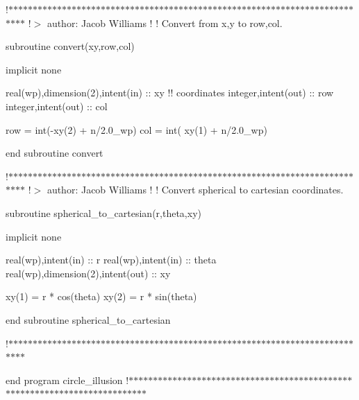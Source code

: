  !$\ast$$\ast$$\ast$$\ast$$\ast$$\ast$$\ast$$\ast$$\ast$$\ast$$\ast$$\ast$$\ast$$\ast$$\ast$$\ast$$\ast$$\ast$$\ast$$\ast$$\ast$$\ast$$\ast$$\ast$$\ast$$\ast$$\ast$$\ast$$\ast$$\ast$$\ast$$\ast$$\ast$$\ast$$\ast$$\ast$$\ast$$\ast$$\ast$$\ast$$\ast$$\ast$$\ast$$\ast$$\ast$$\ast$$\ast$$\ast$$\ast$$\ast$$\ast$$\ast$$\ast$$\ast$$\ast$$\ast$$\ast$$\ast$$\ast$$\ast$$\ast$$\ast$$\ast$$\ast$$\ast$$\ast$$\ast$$\ast$$\ast$$\ast$$\ast$$\ast$$\ast$$\ast$$\ast$ !$>$ author\+: Jacob Williams ! ! Convert from x,y to row,col. \begin{DoxyVerb}subroutine convert(xy,row,col)

implicit none

real(wp),dimension(2),intent(in) :: xy  !! coordinates
integer,intent(out) :: row
integer,intent(out) :: col

row = int(-xy(2) + n/2.0_wp)
col = int( xy(1) + n/2.0_wp)

end subroutine convert
\end{DoxyVerb}
 !$\ast$$\ast$$\ast$$\ast$$\ast$$\ast$$\ast$$\ast$$\ast$$\ast$$\ast$$\ast$$\ast$$\ast$$\ast$$\ast$$\ast$$\ast$$\ast$$\ast$$\ast$$\ast$$\ast$$\ast$$\ast$$\ast$$\ast$$\ast$$\ast$$\ast$$\ast$$\ast$$\ast$$\ast$$\ast$$\ast$$\ast$$\ast$$\ast$$\ast$$\ast$$\ast$$\ast$$\ast$$\ast$$\ast$$\ast$$\ast$$\ast$$\ast$$\ast$$\ast$$\ast$$\ast$$\ast$$\ast$$\ast$$\ast$$\ast$$\ast$$\ast$$\ast$$\ast$$\ast$$\ast$$\ast$$\ast$$\ast$$\ast$$\ast$$\ast$$\ast$$\ast$$\ast$$\ast$ !$>$ author\+: Jacob Williams ! ! Convert spherical to cartesian coordinates. \begin{DoxyVerb}subroutine spherical_to_cartesian(r,theta,xy)

implicit none

real(wp),intent(in) :: r
real(wp),intent(in) :: theta
real(wp),dimension(2),intent(out) :: xy

xy(1) = r * cos(theta)
xy(2) = r * sin(theta)

end subroutine spherical_to_cartesian
\end{DoxyVerb}
 !$\ast$$\ast$$\ast$$\ast$$\ast$$\ast$$\ast$$\ast$$\ast$$\ast$$\ast$$\ast$$\ast$$\ast$$\ast$$\ast$$\ast$$\ast$$\ast$$\ast$$\ast$$\ast$$\ast$$\ast$$\ast$$\ast$$\ast$$\ast$$\ast$$\ast$$\ast$$\ast$$\ast$$\ast$$\ast$$\ast$$\ast$$\ast$$\ast$$\ast$$\ast$$\ast$$\ast$$\ast$$\ast$$\ast$$\ast$$\ast$$\ast$$\ast$$\ast$$\ast$$\ast$$\ast$$\ast$$\ast$$\ast$$\ast$$\ast$$\ast$$\ast$$\ast$$\ast$$\ast$$\ast$$\ast$$\ast$$\ast$$\ast$$\ast$$\ast$$\ast$$\ast$$\ast$$\ast$

end program circle\+\_\+illusion !$\ast$$\ast$$\ast$$\ast$$\ast$$\ast$$\ast$$\ast$$\ast$$\ast$$\ast$$\ast$$\ast$$\ast$$\ast$$\ast$$\ast$$\ast$$\ast$$\ast$$\ast$$\ast$$\ast$$\ast$$\ast$$\ast$$\ast$$\ast$$\ast$$\ast$$\ast$$\ast$$\ast$$\ast$$\ast$$\ast$$\ast$$\ast$$\ast$$\ast$$\ast$$\ast$$\ast$$\ast$$\ast$$\ast$$\ast$$\ast$$\ast$$\ast$$\ast$$\ast$$\ast$$\ast$$\ast$$\ast$$\ast$$\ast$$\ast$$\ast$$\ast$$\ast$$\ast$$\ast$$\ast$$\ast$$\ast$$\ast$$\ast$$\ast$$\ast$$\ast$$\ast$$\ast$$\ast$

